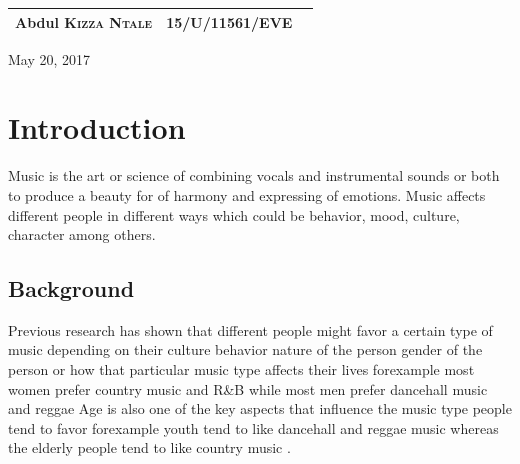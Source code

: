 \documentclass[12pt, a4paper]{report}
\begin{document}
\begin{titlepage}


\begin{table}[!hb]
\centering
\begin{tabular}{|l|l|l|}
\hline
Abdul \textsc{Kizza Ntale} & \textsc{15/U/11561/EVE} \\ \hline
\end{tabular}
\end{table}

{\large May 20, 2017}

\vfill

\end{titlepage}

\tableofcontents
\newpage

\sectionfont{\scshape}
\section*{Introduction}
Music is the art or science of combining vocals and instrumental sounds or both to produce a beauty for of harmony and expressing of emotions. 
Music affects different people in different ways which could be behavior, mood, culture, character among others.

\subsection*{Background}
Previous research has shown that different people might favor a certain type of music depending on their culture behavior nature of the person gender of the person or how that particular music type affects their lives forexample most women prefer country music and R\&B while most men prefer dancehall music and reggae Age  is also one of the key aspects that influence the music type people tend to favor forexample youth tend to like dancehall and reggae music whereas the elderly people tend to like country music  .\\
\end{document}
